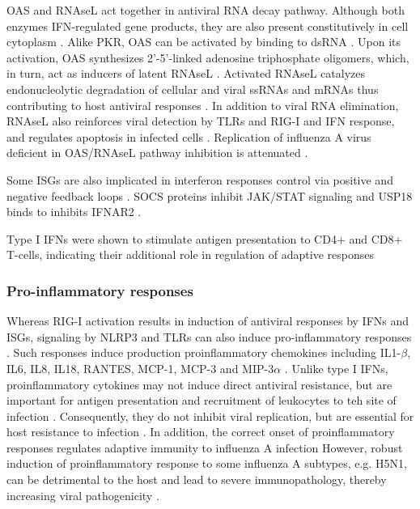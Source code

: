 		\gls{OAS} and \gls{RNAseL} act together in antiviral RNA decay pathway. Although both enzymes \gls{IFN}-regulated gene products, they are also present constitutively in cell cytoplasm \parencite{Sadler2008}. Alike \gls{PKR}, \gls{OAS} can be activated by binding to dsRNA \parencite{Castelli1998}. Upon its activation, \gls{OAS} synthesizes 2'-5'-linked adenosine triphosphate oligomers, which, in turn, act as inducers of latent \gls{RNAseL} \parencite{Rebouillat1999}. Activated \gls{RNAseL} catalyzes endonucleolytic degradation of cellular and viral ssRNAs and mRNAs thus contributing to host antiviral responses \parencite{Dyer2006}. In addition to viral RNA elimination, \gls{RNAseL} also reinforces viral detection by \gls{TLR}s and \gls{RIG-I} and \gls{IFN} response, and regulates apoptosis in infected cells \parencite{Liang2006}. Replication of influenza A virus deficient in \gls{OAS}/\gls{RNAseL} pathway inhibition is attenuated \parencite{Min2006}.
		
		Some \gls{ISG}s are also implicated in interferon responses control via positive and negative feedback loops \parencite{Schneider2014}. SOCS proteins inhibit JAK/STAT signaling \parencite{Hong2013} and USP18 binds to inhibits IFNAR2  \parencite{Ritchie2004}.
		
		Type I \gls{IFN}s were shown to stimulate antigen presentation to CD4+ and CD8+ T-cells, indicating their additional role in regulation of adaptive responses \parencite{Zietara2009}
		
		\subsubsection{Pro-inflammatory responses}
		
		Whereas \gls{RIG-I} activation results in induction of antiviral responses by \gls{IFN}s and \gls{ISG}s, signaling by \gls{NLRP3} and \glspl{TLR} can also induce pro-inflammatory responses \parencite{LeGoffic2007, Allen2009}. Such responses induce production proinflammatory chemokines including IL1-$\beta$, IL6, IL8, IL18, RANTES, MCP-1, MCP-3 and MIP-3$\alpha$ \parencite{Julkunen2000}. Unlike type I \glspl{IFN}, proinflammatory cytokines may not induce direct antiviral resistance, but are important for antigen presentation and recruitment of leukocytes to teh site of infection \parencite{VanDerSluijs2005, Schulz2005, LeGoffic2006}. Consequently, they do not inhibit viral replication, but are essential for host resistance to infection \parencite{Pang2013}. In addition, the correct onset of proinflammatory responses regulates adaptive immunity to influenza A infection \parencite{Trinchieri2003, Ichinohe2009} However, robust induction of proinflammatory response to some influenza A subtypes, e.g. H5N1, can be detrimental to the host and lead to severe immunopathology, thereby increasing viral pathogenicity \parencite{LaGruta2007}.	
			

